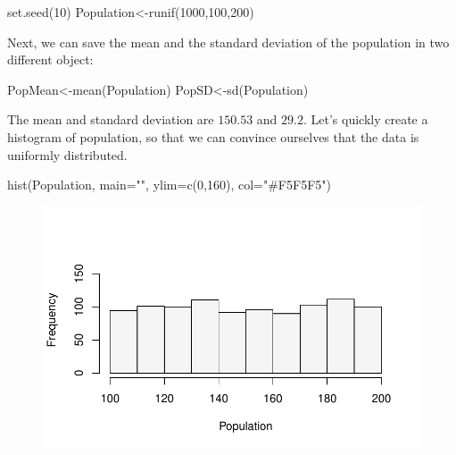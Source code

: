 \documentclass[
  letterpaper,
  DIV=11,
  numbers=noendperiod]{scrreprt}
\newenvironment{Shaded}{\begin{snugshade}}{\end{snugshade}}
\newcommand{\AttributeTok}[1]{\textcolor[rgb]{0.40,0.45,0.13}{#1}}
\newcommand{\DecValTok}[1]{\textcolor[rgb]{0.68,0.00,0.00}{#1}}
\newcommand{\FunctionTok}[1]{\textcolor[rgb]{0.28,0.35,0.67}{#1}}
\newcommand{\NormalTok}[1]{\textcolor[rgb]{0.00,0.23,0.31}{#1}}
\newcommand{\OtherTok}[1]{\textcolor[rgb]{0.00,0.23,0.31}{#1}}
\newcommand{\StringTok}[1]{\textcolor[rgb]{0.13,0.47,0.30}{#1}}
\begin{document}
\begin{Shaded}
\begin{Highlighting}[numbers=left,,]
\FunctionTok{set.seed}\NormalTok{(}\DecValTok{10}\NormalTok{)}
\NormalTok{Population}\OtherTok{\textless{}{-}}\FunctionTok{runif}\NormalTok{(}\DecValTok{1000}\NormalTok{,}\DecValTok{100}\NormalTok{,}\DecValTok{200}\NormalTok{)}
\end{Highlighting}
\end{Shaded}

Next, we can save the mean and the standard deviation of the population
in two different object:

\begin{Shaded}
\begin{Highlighting}[numbers=left,,]
\NormalTok{PopMean}\OtherTok{\textless{}{-}}\FunctionTok{mean}\NormalTok{(Population)}
\NormalTok{PopSD}\OtherTok{\textless{}{-}}\FunctionTok{sd}\NormalTok{(Population)}
\end{Highlighting}
\end{Shaded}

The mean and standard deviation are \(150.53\) and \(29.2\). Let's
quickly create a histogram of population, so that we can convince
ourselves that the data is uniformly distributed.

\begin{Shaded}
\begin{Highlighting}[numbers=left,,]
\FunctionTok{hist}\NormalTok{(Population, }\AttributeTok{main=}\StringTok{""}\NormalTok{, }\AttributeTok{ylim=}\FunctionTok{c}\NormalTok{(}\DecValTok{0}\NormalTok{,}\DecValTok{160}\NormalTok{), }\AttributeTok{col=}\StringTok{"\#F5F5F5"}\NormalTok{)}
\end{Highlighting}
\end{Shaded}

\begin{figure}[H]

{\centering \includegraphics{./12-InferenceI_files/figure-pdf/unnamed-chunk-3-1.pdf}

}

\end{figure}
\end{document}
